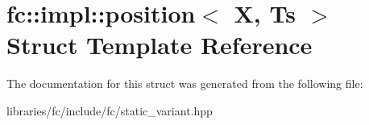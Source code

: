 \hypertarget{structfc_1_1impl_1_1position}{}\section{fc\+:\+:impl\+:\+:position$<$ X, Ts $>$ Struct Template Reference}
\label{structfc_1_1impl_1_1position}


The documentation for this struct was generated from the following file\+:\begin{DoxyCompactItemize}
\item 
libraries/fc/include/fc/static\+\_\+variant.\+hpp\end{DoxyCompactItemize}
